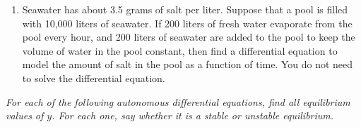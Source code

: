 \documentclass[10pt]{article}
\begin{document}
\begin{enumerate}
\begin{center}
\end{center}
\bigskip


\item Seawater has about 3.5 grams of salt per liter.  Suppose that a pool is filled with 10{,}000 liters of seawater.  If 200 liters of fresh water evaporate from the pool every hour, and 200 liters of seawater are added to the pool to keep the volume of water in the pool constant, then find a differential equation to model the amount of salt in the pool as a function of time.  You do not need to solve the differential equation.  
\vfill

\newpage



\setcounter{enumCount}{\theenumi}
\end{enumerate}

\noindent
\textit{For each of the following autonomous differential equations, find all equilibrium values of $y$. For each one, say whether it is a stable or unstable equilibrium.}
\end{document}
